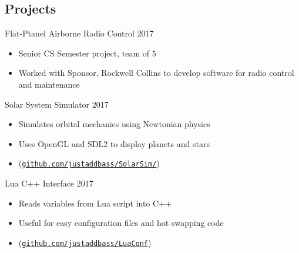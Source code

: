 \documentclass[line,margin]{res}
\begin{document}
\begin{resume}
\section{Projects}
\vspace{12pt}


Flat-Ptanel Airborne Radio Control
\hfill 2017
	\begin{itemize} \itemsep -2pt
		\item Senior CS Semester project, team of 5
		\item Worked with Sponsor, Rockwell Collins to develop software for radio control and maintenance
	\end{itemize}

\vspace{-8pt}
Solar System Simulator
\hfill 2017
	\begin{itemize} \itemsep -2pt
		\item Simulates orbital mechanics using Newtonian physics
		\item Uses OpenGL and SDL2 to display planets and stars
		\item (\href{https://github.com/justaddbass/SolarSim/}{\texttt{github.com/justaddbass/SolarSim/}})
	\end{itemize}

\vspace{-8pt}
Lua C++ Interface
\hfill 2017
	\begin{itemize} \itemsep -2pt
		\item Reads variables from Lua script into C++
		\item Useful for easy configuration files and hot swapping code
		\item  (\href{https://github.com/justaddbass/LuaConf}{\texttt{github.com/justaddbass/LuaConf}})
		\end{itemize}



\end{resume}
\end{document}
